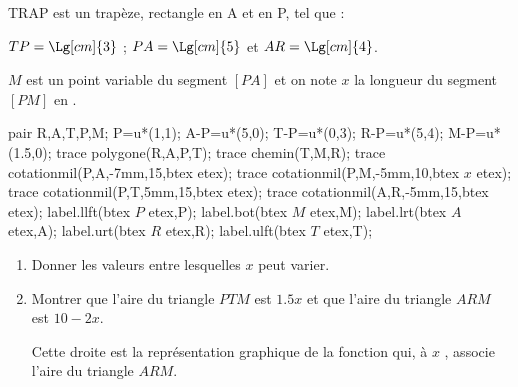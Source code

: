 \begin{exercice*}
    TRAP est un trapèze, rectangle en A et en P, tel que :

    $TP=\Lg[cm]{3}$ ; $PA=\Lg[cm]{5}$ et $AR=\Lg[cm]{4}$.
    
    $M$ est un point variable du segment $[PA]$ et on note $x$ la longueur du segment $[PM]$ en \Lg[cm]{}.

    \begin{Geometrie}
        pair R,A,T,P,M;
        P=u*(1,1);
        A-P=u*(5,0);
        T-P=u*(0,3);
        R-P=u*(5,4);
        M-P=u*(1.5,0);
        trace polygone(R,A,P,T);
        trace chemin(T,M,R);
        trace cotationmil(P,A,-7mm,15,btex  etex);
        trace cotationmil(P,M,-5mm,10,btex $x$ etex);
        trace cotationmil(P,T,5mm,15,btex  etex);
        trace cotationmil(A,R,-5mm,15,btex  etex);
        label.llft(btex $P$ etex,P);
        label.bot(btex $M$ etex,M);
        label.lrt(btex $A$ etex,A);
        label.urt(btex $R$ etex,R);
        label.ulft(btex $T$ etex,T);        
    \end{Geometrie}

    \begin{enumerate}
        \item Donner les valeurs entre lesquelles $x$ peut varier.
        \item Montrer que l’aire du triangle $PTM$ est $\num{1,5}x$ et que l’aire du triangle $ARM$ est $10-2x$.
        
        \medskip
        Cette droite est la représentation graphique de la fonction qui, à $x$ , associe l’aire du triangle $ARM$.


\end{enumerate}
\end{exercice*}
